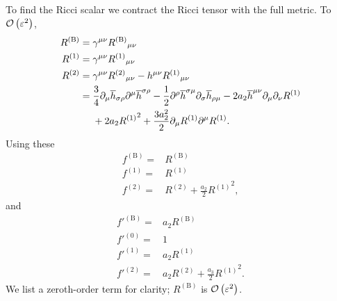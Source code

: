 To find the Ricci scalar we contract the Ricci tensor with the full metric. To $\mathcal{O}\left({\varepsilon^2}\right)$,
\begin{subequations}
\begin{align}
R^{(\text{B})} = {} & \gamma^{\mu\nu} {R^{(\text{B})}}_{\mu\nu} \\
R^{(1)} = {} & \gamma^{\mu\nu} {R^{(1)}}_{\mu\nu} \\
R^{(2)} = {} & \gamma^{\mu\nu} {R^{(2)}}_{\mu\nu} - h^{\mu\nu} {R^{(1)}}_{\mu\nu} \nonumber \\*
 = {} & \frac{3}{4}\partial_\mu\overline{h}_{\sigma\rho}\partial^\mu\overline{h}^{\sigma\rho} - \frac{1}{2} \partial^\rho\overline{h}^{\sigma\mu}\partial_\sigma\overline{h}_{\rho\mu} - 2a_2 \overline{h}^{\mu\nu}\partial_\mu\partial_\nu R^{(1)} \nonumber \\*
  & + {} 2 a_2 {R^{(1)}}^2 + \frac{3a_2^2}{2}\partial_\mu R^{(1)} \partial^\mu R^{(1)}.
\end{align}
\end{subequations}
Using these
\begin{subequations}
\begin{align}
f^{(\text{B})} = {} & R^{(\text{B})} \\
f^{(1)} = {} & R^{(1)} \\
f^{(2)} = {} & R^{(2)} + \frac{a_2}{2}{R^{(1)}}^2,
\end{align}
\end{subequations}
and
\begin{subequations}
\begin{align}
f'^{(\text{B})} = {} & a_2 R^{(\text{B})} \\
f'^{(0)} = {} & 1 \\
f'^{(1)} = {} & a_2 R^{(1)} \\
f'^{(2)} = {} & a_2 R^{(2)} + \frac{a_3}{2}{R^{(1)}}^2.
\end{align}
\end{subequations}
We list a zeroth-order term for clarity; $R^{(\text{B})}$ is $\mathcal{O}\left({\varepsilon^2}\right)$.


